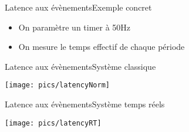 \begin{frame}{Latence aux évènements}{Exemple concret}
  \begin{itemize}
  \item On paramètre un timer à 50Hz
  \item On mesure le temps effectif de chaque période
  \end{itemize}
\end{frame}

\begin{frame}{Latence aux évènements}{Système classique}
  \begin{center}
    \texttt{[image: pics/latencyNorm]}
  \end{center}
\end{frame}

\begin{frame}{Latence aux évènements}{Système temps réels}
  \begin{center}
    \texttt{[image: pics/latencyRT]}
  \end{center}
\end{frame}

